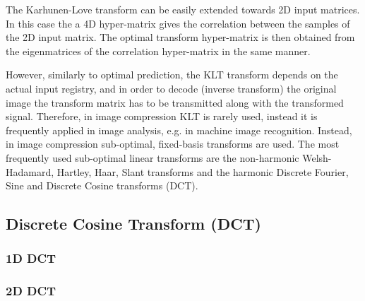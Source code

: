\vspace{3mm}
The Karhunen-Love transform can be easily extended towards 2D input matrices.
In this case the a 4D hyper-matrix gives the correlation between the samples of the 2D input matrix.
The optimal transform hyper-matrix is then obtained from the eigenmatrices of the correlation hyper-matrix in the same manner.

\vspace{3mm}
However, similarly to optimal prediction, the KLT transform depends on the actual input registry, and in order to decode (inverse transform) the original image the transform matrix has to be transmitted along with the transformed signal.
Therefore, in image compression KLT is rarely used, instead it is frequently applied in image analysis, e.g. in machine image recognition.
Instead, in image compression sub-optimal, fixed-basis transforms are used.
The most frequently used sub-optimal linear transforms are the non-harmonic Welsh-Hadamard, Hartley, Haar, Slant transforms and the harmonic Discrete Fourier, Sine and Discrete Cosine transforms (DCT).

\subsection{Discrete Cosine Transform (DCT)}

\subsubsection*{1D DCT}

\subsubsection*{2D DCT}